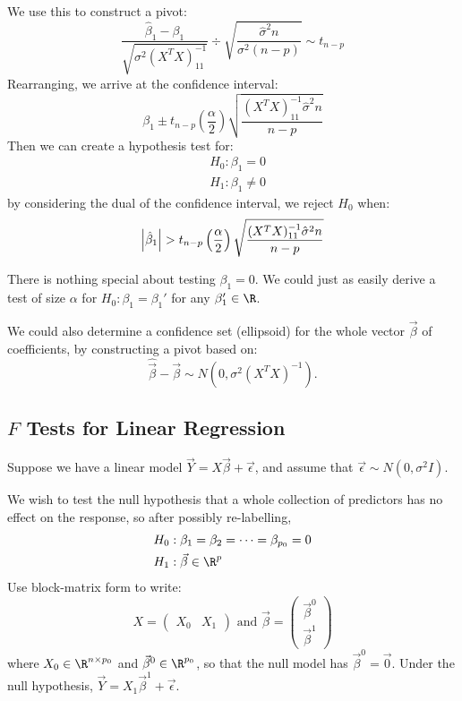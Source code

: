 \documentclass[../Main.tex]{subfiles}
\begin{document}
We use this to construct a pivot:
\begin{equation*}
    \frac{\hat{\beta}_1 - \beta_1}{\sqrt{\sigma^2(X^TX)_{11}^{-1}}} \div \sqrt{\frac{\hat{\sigma}^2 n}{\sigma^2(n-p)}} \sim t_{n-p}
\end{equation*}
Rearranging, we arrive at the confidence interval:
\begin{equation*}
    \beta_1 \pm t_{n-p} \left(\frac{\alpha}{2}\right) \sqrt{\frac{(X^T X)_{11}^{-1}\hat{\sigma}^2 n}{n-p}}
\end{equation*}
Then we can create a hypothesis test for:
\begin{align*}
    &H_0: \beta_1 = 0 \\
    &H_1: \beta_1 \neq 0
\end{align*}
by considering the dual of the confidence interval, we reject $H_0$ when:
\begin{equation*}
    \left|\hat{\beta}_1\right| > t_{n-p} \left(\frac{\alpha}{2}\right) \sqrt{\frac{(X^T X)_{11}^{-1}\hat{\sigma}^2 n}{n-p}}
\end{equation*}
\begin{remarks}
    \item There is nothing special about testing $\beta_1 = 0$. We could just as easily derive a test of size $\alpha$ for $H_0: \beta_1 = \beta_1'$ for any $\beta_1' \in \R$.
    \item We could also determine a confidence set (ellipsoid) for the whole vector $\vec{\beta}$ of coefficients, by constructing a pivot based on:
        \begin{equation*}
            \hat{\vec{\beta}} - \vec{\beta} \sim N(0, \sigma^2 (X^TX)^{-1}).
        \end{equation*}
\end{remarks}
\subsection{\texorpdfstring{$F$}{F} Tests for Linear Regression}
Suppose we have a linear model $\vec{Y} = X\vec{\beta} + \vec{\epsilon}$, and assume that $\vec{\epsilon} \sim N(0, \sigma^2 I)$.

We wish to test the null hypothesis that a whole collection of predictors has no effect on the response, so after possibly re-labelling,
\begin{align*}
    &H_0: \beta_1 = \beta_2 = \cdots = \beta_{p_0} = 0 \\
    &H_1: \vec{\beta} \in \R^{p}
\end{align*}
Use block-matrix form to write:
\begin{equation*}
    X = \begin{pmatrix}X_0 & X_1\end{pmatrix} \text{ and } \vec{\beta} = \begin{pmatrix}\vec{\beta}^0 \\ \vec{\beta}^1\end{pmatrix}
\end{equation*}
where $X_0 \in \R^{n \times p_0}$ and $\vec{\beta}^0 \in \R^{p_0}$, so that the null model has $\vec{\beta}^0 = \vec0$. Under the null hypothesis, $\vec{Y} = X_1 \vec{\beta}^1 + \vec{\epsilon}$.
\end{document}
